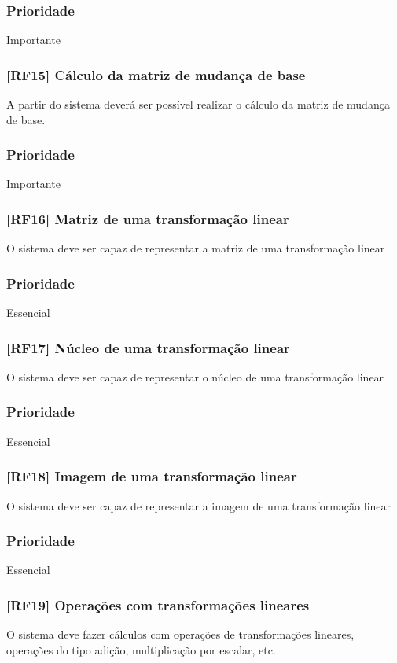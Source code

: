 \documentclass{scrreprt}
\begin{document}
\subsubsection{Prioridade}
Importante

\subsubsection{[RF15] Cálculo da matriz de mudança de base}
A partir do sistema deverá ser possível realizar o cálculo da matriz de mudança de base.
\subsubsection{Prioridade}
Importante

\subsubsection{[RF16] Matriz de uma transformação linear }
O sistema deve ser capaz de representar a matriz de uma transformação linear
\subsubsection{Prioridade}
Essencial

\subsubsection{[RF17] Núcleo de uma transformação linear }
O sistema deve ser capaz de representar o núcleo de uma transformação linear
\subsubsection{Prioridade}
Essencial

\subsubsection{[RF18] Imagem de uma transformação linear }
O sistema deve ser capaz de representar a imagem de uma transformação linear
\subsubsection{Prioridade}
Essencial

\subsubsection{[RF19]  Operações com transformações lineares}
O sistema deve fazer cálculos com operações de transformações lineares, operações do tipo adição, multiplicação por escalar, etc.
\end{document}

